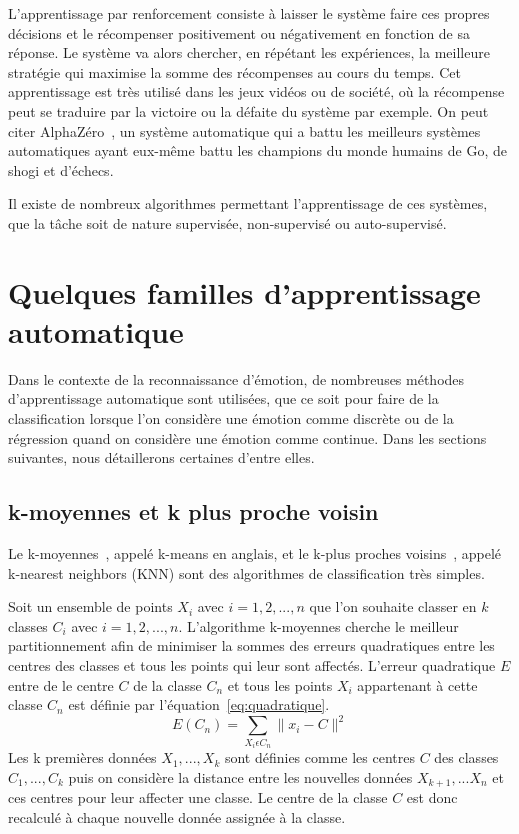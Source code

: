L'apprentissage par renforcement consiste à laisser le système faire ces propres décisions et le récompenser positivement ou négativement en fonction de sa réponse. Le système va alors chercher, en répétant les expériences, la meilleure stratégie qui maximise la somme des récompenses au cours du temps. Cet apprentissage est très utilisé dans les jeux vidéos ou de société, où la récompense peut se traduire par la victoire ou la défaite du système par exemple. On peut citer AlphaZéro~\cite{Silver2018}, un système automatique qui a battu les meilleurs systèmes automatiques ayant eux-même battu les champions du monde humains de Go, de shogi et d'échecs.

Il existe de nombreux algorithmes permettant l'apprentissage de ces systèmes, que la tâche soit de nature supervisée, non-supervisé ou auto-supervisé.

\section{Quelques familles d'apprentissage automatique}
Dans le contexte de la reconnaissance d'émotion, de nombreuses méthodes d'apprentissage automatique sont utilisées, que ce soit pour faire de la classification lorsque l'on considère une émotion comme discrète ou de la régression quand on considère une émotion comme continue.
Dans les sections suivantes, nous détaillerons certaines d'entre elles.

\subsection{k-moyennes et k plus proche voisin}
Le k-moyennes~\cite{Lloyd1982}, appelé k-means en anglais, et le k-plus proches voisins~\cite{Fix1951,Cover1967}, appelé k-nearest neighbors (KNN) sont des algorithmes de classification très simples.

Soit un ensemble de points $X_i$ avec $i=1,2,...,n$ que l'on souhaite classer en $k$ classes $C_i$ avec $i=1,2,...,n$. L’algorithme k-moyennes cherche le meilleur partitionnement afin de minimiser la sommes des erreurs quadratiques entre les centres des classes et tous les points qui leur sont affectés.
L’erreur quadratique $E$ entre de le centre $C$ de la classe $C_n$ et tous les points $X_i$ appartenant à cette classe $C_n$ est définie par l'équation~\ref{eq:quadratique}.
\begin{equation}
  E(C_n) = \sum_{X_i\epsilon C_n}   \| x_i - C \|^2
  \label{eq:quadratique}
\end{equation}
Les k premières données $X_1,...,X_k$ sont définies comme les centres $C$ des classes $C_1,...,C_k$ puis on considère la distance entre les nouvelles données $X_{k+1},...X_n$ et ces centres pour leur affecter une classe. Le centre de la classe $C$ est donc recalculé à chaque nouvelle donnée assignée à la classe.

